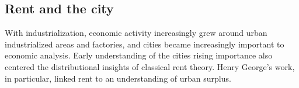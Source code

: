 

\subsection{Rent and the city} 
With industrialization, economic activity increasingly grew around urban industrialized areas and factories, %
and cities became increasingly important to economic analysis. Early understanding of the cities rising importance also centered the distributional insights of classical rent theory. %
Henry George's work, in particular, linked rent to an understanding of urban surplus. %

